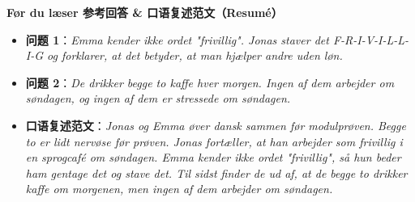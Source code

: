 \begin{answerbox}
\textbf{Før du læser 参考回答 \& 口语复述范文（Resumé）}
\begin{itemize}
  \item \textbf{问题 1}：\textit{Emma kender ikke ordet "frivillig". Jonas staver det F-R-I-V-I-L-L-I-G og forklarer, at det betyder, at man hjælper andre uden løn.}
  \item \textbf{问题 2}：\textit{De drikker begge to kaffe hver morgen. Ingen af dem arbejder om søndagen, og ingen af dem er stressede om søndagen.}
  \item \textbf{口语复述范文}：\textit{Jonas og Emma øver dansk sammen før modulprøven. Begge to er lidt nervøse før prøven. Jonas fortæller, at han arbejder som frivillig i en sprogcafé om søndagen. Emma kender ikke ordet "frivillig", så hun beder ham gentage det og stave det. Til sidst finder de ud af, at de begge to drikker kaffe om morgenen, men ingen af dem arbejder om søndagen.}
\end{itemize}
\end{answerbox}
